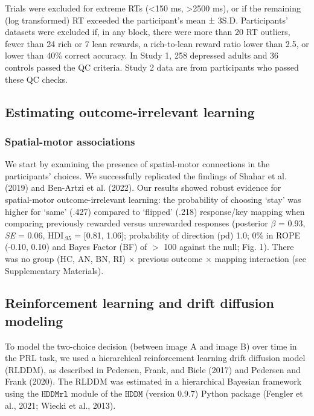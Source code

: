 \documentclass[
  man,floatsintext]{apa6}
\begin{document}
Trials were excluded for extreme RTs (\textless150 ms, \textgreater2500 ms), or if
the remaining (log transformed) RT exceeded the participant's
mean ± 3S.D. Participants' datasets were excluded if, in any
block, there were more than 20 RT outliers, fewer than 24 rich
or 7 lean rewards, a rich-to-lean reward ratio lower than 2.5, or
lower than 40\% correct accuracy. In Study 1, 258 depressed adults
and 36 controls passed the QC criteria. Study 2 data are from participants who passed these QC checks.

\hypertarget{estimating-outcome-irrelevant-learning}{%
\subsection{Estimating outcome-irrelevant learning}\label{estimating-outcome-irrelevant-learning}}

\hypertarget{spatial-motor-associations}{%
\subsubsection{Spatial-motor associations}\label{spatial-motor-associations}}

We start by examining the presence of spatial-motor connections in the participants' choices. We successfully replicated the findings of Shahar et al. (2019) and Ben-Artzi et al. (2022). Our results showed robust evidence for spatial-motor outcome-irrelevant learning: the probability of choosing `stay' was higher for `same' (.427) compared to `flipped' (.218) response/key mapping when comparing previously rewarded versus unrewarded responses (posterior \(\beta\) = 0.93, \emph{SE} = 0.06, \(\text{HDI}_{.95}\) = {[}0.81, 1.06{]}; probability of direction (pd) 1.0; 0\% in ROPE (-0.10, 0.10) and Bayes Factor (BF) of \(>\) 100 against the null; Fig. 1). There was no group (HC, AN, BN, RI) \(\times\) previous outcome \(\times\) mapping interaction (see Supplementary Materials).

\hypertarget{reinforcement-learning-and-drift-diffusion-modeling}{%
\subsection{Reinforcement learning and drift diffusion modeling}\label{reinforcement-learning-and-drift-diffusion-modeling}}

To model the two-choice decision (between image A and image B) over time in the PRL task, we used a hierarchical reinforcement learning drift diffusion model (RLDDM), as described in Pedersen, Frank, and Biele (2017) and Pedersen and Frank (2020). The RLDDM was estimated in a hierarchical Bayesian framework using the \(\texttt{HDDMrl}\) module of the \(\texttt{HDDM}\) (version 0.9.7) Python package (Fengler et al., 2021; Wiecki et al., 2013).
\end{document}
